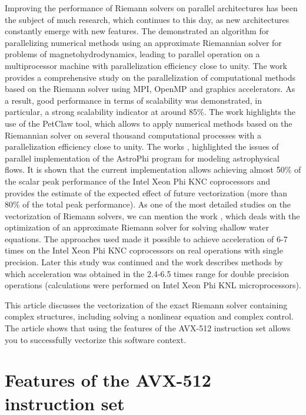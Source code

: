 \documentclass[utf8,english]{psta}%
\begin{document}
Improving the performance of Riemann solvers on parallel architectures has been the subject of much research, which continues to this day, as new architectures constantly emerge with new features.
The \cite{Shumlak} demonstrated an algorithm for parallelizing numerical methods using an approximate Riemannian solver for problems of magnetohydrodynamics, leading to parallel operation on a multiprocessor machine with parallelization efficiency close to unity.
The work \cite{Schive} provides a comprehensive study on the parallelization of computational methods based on the Riemann solver using MPI, OpenMP and graphics accelerators.
As a result, good performance in terms of scalability was demonstrated, in particular, a strong scalability indicator at around 85\%.
The \cite{Mandli} work highlights the use of the PetClaw tool, which allows to apply numerical methods based on the Riemannian solver on several thousand computational processes with a parallelization efficiency close to unity.
The works \cite{Kulikov}, \cite{Kulikov2} highlighted the issues of parallel implementation of the AstroPhi program for modeling astrophysical flows.
It is shown that the current implementation allows achieving almost 50\% of the scalar peak performance of the Intel Xeon Phi KNC coprocessors and provides the estimate of the expected effect of future vectorization (more than 80\% of the total peak performance).
As one of the most detailed studies on the vectorization of Riemann solvers, we can mention the work \cite{BaderSWEVect}, which deals with the optimization of an approximate Riemann solver for solving shallow water equations.
The approaches used made it possible to achieve acceleration of 6-7 times on the Intel Xeon Phi KNC coprocessors on real operations with single precision.
Later this study was continued and the work \cite{FerreiraSWEVect} describes methods by which acceleration was obtained in the 2.4-6.5 times range for double precision operations (calculations were performed on Intel Xeon Phi KNL microprocessors).

This article discusses the vectorization of the exact Riemann solver containing complex structures, including solving a nonlinear equation and complex control.
The article shows that using the features of the AVX-512 instruction set allows you to successfully vectorize this software context.

\section{Features of the AVX-512 instruction set}
\end{document}
